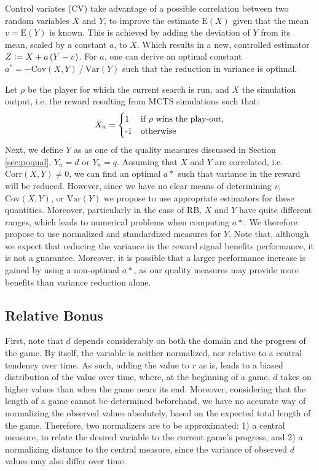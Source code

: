 \documentclass{ecai2014}
\newcommand{\E}[1]{\mathrm{E}\left( #1 \right)}
\newcommand{\Var}[1]{\mathrm{Var}\left( #1 \right)}
\newcommand{\Cov}[1]{\mathrm{Cov}\left( #1 \right)}
\newcommand{\Corr}[1]{\mathrm{Corr}\left( #1 \right)}
\newcommand{\defeq}{\vcentcolon=}
\begin{document}
Control variates (CV) take advantage of a possible correlation between two random variables $X$ and $Y$, to improve the estimate $\E{X}$ given that the mean $v=\E{Y}$ is known. This is achieved by adding the deviation of $Y$ from its mean, scaled by a constant $a$, to $X$. Which results in a new, controlled estimator $Z\defeq X+a\left(Y-v\right)$. For $a$, one can derive an optimal constant $a^*=-\Cov{X,Y}\mathbin{/}\Var{Y}$ such that the reduction in variance is optimal.

Let $\rho$ be the player for which the current search is run, and $X$ the simulation output, i.e. the reward resulting from MCTS simulations such that:
\begin{equation}
  \bar{X}_n=
  \begin{cases}
    $1$ 	& \text{if $\rho$ wins the play-out},\\
    $-1$ 	& \text{otherwise}
  \end{cases}
\end{equation}
Next, we define $Y$ as as one of the quality measures discussed in Section \ref{sec:poqual}, $Y_n=d$ or $Y_n=q$. Assuming that $X$ and $Y$ are correlated, i.e. $\Corr{X,Y}\neq0$, we can find an optimal $a*$ such that variance in the reward will be reduced. However, since we have no clear means of determining $v$, $\Cov{X,Y}$, or $\Var{Y}$ we propose to use appropriate estimators for these quantities. Moreover, particularly in the case of RB, $X$ and $Y$ have quite different ranges, which leads to numerical problems when computing $a*$. We therefore propose to use normalized and standardized measures for $Y$. Note that, although we expect that reducing the variance in the reward signal benefits performance, it is not a guarantee. Moreover, it is possible that a larger performance increase is gained by using a non-optimal $a*$, as our quality measures may provide more benefits than variance reduction alone.

\subsection{Relative Bonus}
\label{subsec:rb}
First, note that $d$ depends considerably on both the domain and the progress of the game. By itself, the variable is neither normalized, nor relative to a central tendency over time. As such, adding the value to $r$ as is, leads to a biased distribution of the value over time, where, at the beginning of a game, $d$ takes on higher values than when the game nears its end. Moreover, considering that the length of a game cannot be determined beforehand, we have no accurate way of normalizing the observed values absolutely, based on the expected total length of the game. Therefore, two normalizers are to be approximated: 1) a central measure, to relate the desired variable to the current game's progress, and 2) a normalizing distance to the central measure, since the variance of observed $d$ values may also differ over time.
\end{document}
